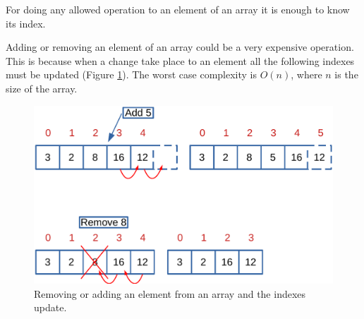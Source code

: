 For doing any allowed operation to an element of an array it is enough to know its index. 

Adding or removing an element of an array could be a very expensive operation. This is because when a change take place to an element all the following indexes must be updated (Figure \ref{array_2}). The worst case complexity is \(O(n)\), where \(n\) is the size of the array.
\begin{figure}[H]
	\begin{center}
		\includegraphics[scale=.6]{chapters/datastructures/images/array_2.pdf}
		\caption[Removing or adding an element from an array and the indexes update.]{Removing or adding an element from an array and the indexes update.}
		\label{array_2}
	\end{center}
\end{figure}

